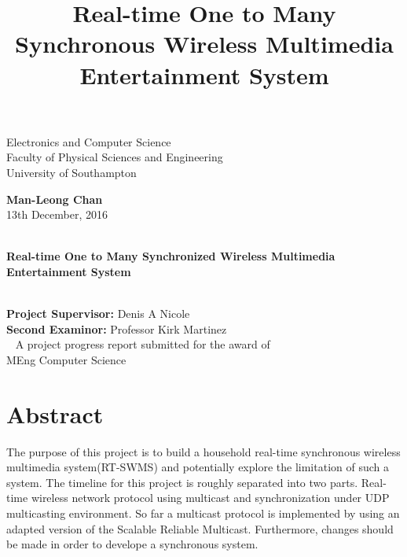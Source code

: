 \documentclass[12pt]{article}
\title{Real-time One to Many Synchronous Wireless Multimedia Entertainment System}
\newcommand{\supervisor}{Denis A Nicole}
\newcommand{\secondexaminor}{Professor Kirk Martinez}
\begin{document}
\begin{center}
Electronics and Computer Science \\
Faculty of Physical Sciences and Engineering \\
University of Southampton \\
\end{center}

\begin{center}
\large
\textbf{Man-Leong Chan}\\
\normalsize
13th December, 2016\\ \
\newline
\newline
\end{center}

\begin{center}

\LARGE
\textbf{Real-time One to Many Synchronized Wireless Multimedia Entertainment System}\\ \
\newline
\newline
\newline
\newline
\newline
\newline
\end{center}

\begin{center}

\textbf{Project Supervisor: } \supervisor{}\\
\textbf{Second Examinor: } \secondexaminor{}\\ \
\newline
\newline
A project progress report submitted for the award of \\
MEng Computer Science
\end{center}
\pagebreak


\section*{Abstract}
The purpose of this project is to build a household real-time synchronous wireless multimedia system(RT-SWMS) and potentially explore the limitation of such a system. The timeline for this project is roughly separated into two parts. Real-time wireless network protocol using multicast and synchronization under UDP multicasting environment. So far a multicast protocol is implemented by using an adapted version of the Scalable Reliable Multicast. Furthermore, changes should be made in order to develope a synchronous system.
\end{document}
